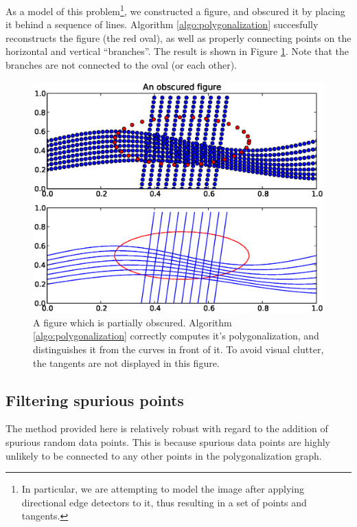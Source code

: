 \documentclass{article}
\numberwithin{cntr}{section}
\numberwithin{equation}{section}
\begin{document}
As a model of this problem\footnote{In particular, we are attempting to model the image after applying directional edge detectors to it, thus resulting in a set of points and tangents.}, we constructed a figure, and obscured it by placing it behind a sequence of lines. Algorithm \ref{algo:polygonalization} succesfully reconstructs the figure (the red oval), as well as properly connecting points on the horizontal and vertical ``branches''. The result is shown in Figure \ref{fig:obscuredExample}. Note that the branches are not connected to the oval (or each other).

\begin{figure}
\setlength{\unitlength}{0.240900pt}
\ifx\plotpoint\undefined\newsavebox{\plotpoint}\fi
\sbox{\plotpoint}{\rule[-0.200pt]{0.400pt}{0.400pt}}%
\includegraphics[scale=0.5]{obscured_figure.eps}

\caption{A figure which is partially obscured. Algorithm \ref{algo:polygonalization} correctly computes it's polygonalization, and distinguishes it from the curves in front of it. To avoid visual clutter, the tangents are not displayed in this figure.}
\label{fig:obscuredExample}
\end{figure}

\subsection{Filtering spurious points}

The method provided here is relatively robust with regard to the addition of spurious random data points. This is because spurious data points are highly unlikely to be connected to any other points in the polygonalization graph.
\end{document}
